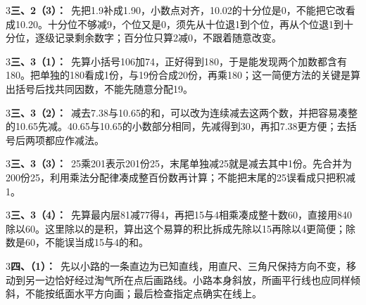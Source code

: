 \documentclass[multi=snippet,border={5bp 20bp 5bp 5bp}]{standalone}
\newenvironment{snippet}[3]{\begin{minipage}{#1bp}\color{answerred}\fontsize{#2}{#3}\selectfont\raggedright}{\end{minipage}}
\begin{document}
\begin{snippet}{505}{11.5}{14}\begin{multicols}{3}\raggedcolumns \textbf{三、2（3）：}\ 先把1.9补成1.90，小数点对齐，10.02的十分位是0，不能把它改看成10.20。十分位不够减9，个位又是0，须先从十位退1到个位，再从个位退1到十分位，逐级记录剩余数字；百分位只算2减0，不跟着随意改变。\end{multicols}\end{snippet}
\begin{snippet}{505}{11.5}{14}\begin{multicols}{3}\raggedcolumns \textbf{三、3（1）：}\ 先算小括号106加74，正好得到180，于是能发现两个加数都含有180。把单独的180看成1份，与19份合成20份，再乘180；这一简便方法的关键是算出括号后找共同因数，不能先随意分配19。\end{multicols}\end{snippet}
\begin{snippet}{505}{11.5}{14}\begin{multicols}{3}\raggedcolumns \textbf{三、3（2）：}\ 减去7.38与10.65的和，可以改为连续减去这两个数，并把容易凑整的10.65先减。40.65与10.65的小数部分相同，先减得到30，再扣7.38更方便；去括号后两项都应作减法。\end{multicols}\end{snippet}
\begin{snippet}{505}{11.5}{14}\begin{multicols}{3}\raggedcolumns \textbf{三、3（3）：}\ 25乘201表示201份25，末尾单独减25就是减去其中1份。先合并为200份25，利用乘法分配律凑成整百份数再计算；不能把末尾的25误看成只把积减1。\end{multicols}\end{snippet}
\begin{snippet}{505}{11.5}{14}\begin{multicols}{3}\raggedcolumns \textbf{三、3（4）：}\ 先算最内层81减77得4，再把15与4相乘凑成整十数60，直接用840除以60。这里除以的是积，算出这个易算的积比拆成先除以15再除以4更简便；除数是60，不能误当成15与4的和。\end{multicols}\end{snippet}
\begin{snippet}{505}{11.5}{14}\begin{multicols}{3}\raggedcolumns \textbf{四、（1）：}\ 先以小路的一条直边为已知直线，用直尺、三角尺保持方向不变，移动到另一边恰好经过淘气所在点后画路线。小路本身斜放，所画平行线也应同样倾斜，不能按纸面水平方向画；最后检查指定点确实在线上。\end{multicols}\end{snippet}
\end{document}
